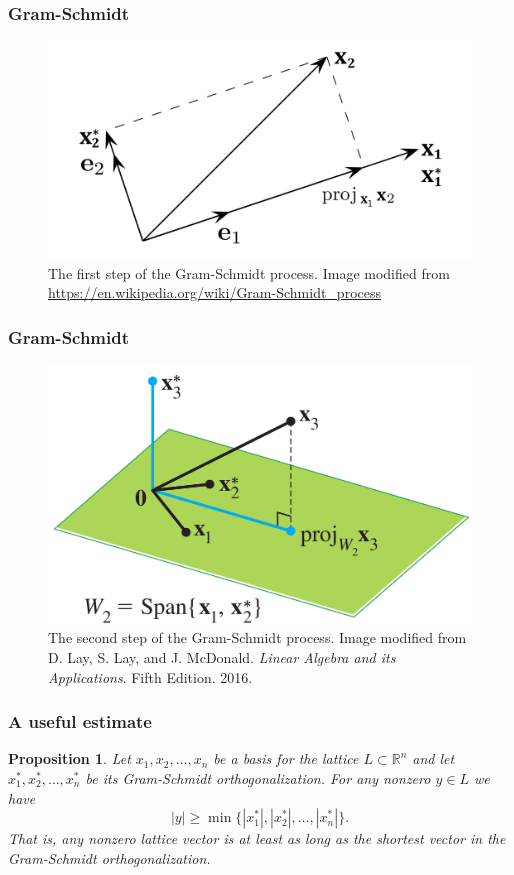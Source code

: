 \documentclass{beamer}
\newcommand{\reals}{\mathbb{R}}
\newtheorem{proposition}[theorem]{Proposition}
\begin{document}
\begin{frame}
	\frametitle{Gram-Schmidt}
	\begin{figure}
	\includegraphics[scale=.7]{gs1.png}
	\caption{The first step of the Gram-Schmidt process. Image modified from \url{https://en.wikipedia.org/wiki/Gram-Schmidt_process}}
	\end{figure}
\end{frame}

\begin{frame}
	\frametitle{Gram-Schmidt}
	\begin{figure}
		\includegraphics[scale=.2]{gs2.PNG}
		\caption{The second step of the Gram-Schmidt process. Image modified from D. Lay, S. Lay, and J. McDonald. \textit{Linear Algebra and its Applications}. Fifth Edition. 2016.}
	\end{figure}
\end{frame}

\begin{frame}
	\frametitle{A useful estimate}
	\begin{proposition}
		Let $x_1, x_2, \ldots, x_n$ be a basis for the lattice $L\subset \reals^n$ and let $x_1^*, x_2^*, \ldots, x_n^*$ be its Gram-Schmidt orthogonalization. For any nonzero $y\in L$ we have
		\[
		|y| \geq \min \{|x_1^*|, |x_2^*|, \ldots, |x_n^*|\}.
		\]
		That is, any nonzero lattice vector is at least as long as the shortest vector in the Gram-Schmidt orthogonalization.
	\end{proposition}
\end{frame}
\end{document}
